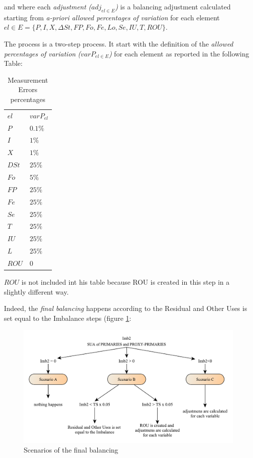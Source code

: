 \documentclass[]{article}
\begin{document}
and where each \emph{adjustment (\(adj_{el \in E}\))} is a balancing
adjustment calculated starting from \emph{a-priori allowed percentages
of variation} for each element
\(el \in E = \{P,I,X,\Delta St, FP,Fo,Fe,Lo,Se,IU,T,ROU\}\).

The process is a two-step process. It start with the definition of the
\emph{allowed percentages of variation} \emph{(\(varP_{el \in E}\))} for
each element as reported in the following Table:

\begin{table}[ht]
\caption {Measurement Errors percentages}
\centering
\begin{tabular}{|l|l|}
\cline {1-2}
\boldmath$el$ & \boldmath$varP_{el}$\\
\cline {1-2}
$P$   & $0.1\%$ \\
\cline {1-2}
$I$   & $1\%$   \\
\cline {1-2}
$X$   & $1\%$   \\
\cline {1-2}
$DSt$ & $25\%$  \\
\cline {1-2}
$Fo$  & $5\%$   \\
\cline {1-2}
$FP$  & $25\%$  \\
\cline {1-2}
$Fe$  & $25\%$  \\
\cline {1-2}
$Se$  & $25\%$  \\
\cline {1-2}
$T$   & $25\%$  \\
\cline {1-2}
$IU$  & $25\%$  \\
\cline {1-2}
$L$   & $25\%$  \\
\cline {1-2}
$ROU$ & $0$     \\
\cline {1-2}
\end{tabular}
\end{table}

\(ROU\) is not included int his table because ROU is created in this
step in a slightly different way.

Indeed, the \emph{final balancing} happens according to the Residual and
Other Uses is set equal to the Imbalance steps (figure \ref{fig:f10}:

\begin{figure}[H]

{\centering \includegraphics[width=1\linewidth]{images/StandBal/11_ScenariosFinalBal} 

}

\caption{\label{fig:f10}Scenarios of the final balancing}\label{fig:f10}
\end{figure}
\end{document}
